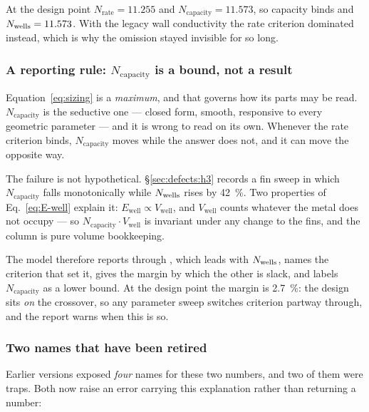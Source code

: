 At the design point $N_{\mathrm{rate}}=11.255$ and
$N_{\mathrm{capacity}}=11.573$, so capacity binds and $N_{\mathrm{wells}}=11.573$. With
the legacy wall conductivity the rate criterion dominated instead, which is why
the omission stayed invisible for so long.

\subsubsection*{A reporting rule: $N_{\mathrm{capacity}}$ is a bound, not a result}
\label{sec:hydraulics:capacity}

Equation~\eqref{eq:sizing} is a \emph{maximum}, and that governs how its parts
may be read. $N_{\mathrm{capacity}}$ is the seductive one --- closed form,
smooth, responsive to every geometric parameter --- and it is wrong to read on
its own. Whenever the rate criterion binds, $N_{\mathrm{capacity}}$ moves while
the answer does not, and it can move the opposite way.

The failure is not hypothetical. \S\ref{sec:defects:h3} records a fin sweep in
which $N_{\mathrm{capacity}}$ falls monotonically while $N_{\mathrm{wells}}$ rises by
\SI{42}{\percent}. Two properties of Eq.~\eqref{eq:E-well} explain it:
$E_{\mathrm{well}} \propto V_{\mathrm{well}}$, and $V_{\mathrm{well}}$ counts
whatever the metal does not occupy --- so $N_{\mathrm{capacity}}\cdot
V_{\mathrm{well}}$ is invariant under any change to the fins, and the column is
pure volume bookkeeping.

The model therefore reports through , which leads with
$N_{\mathrm{wells}}$, names the criterion that set it, gives the margin by which the other
is slack, and labels $N_{\mathrm{capacity}}$ as a lower bound. At the design
point the margin is \SI{2.7}{\percent}: the design sits \emph{on} the crossover,
so any parameter sweep switches criterion partway through, and the report warns
when this is so.

\subsubsection*{Two names that have been retired}

Earlier versions exposed \emph{four} names for these two numbers, and two of
them were traps. Both now raise an error carrying this explanation rather than
returning a number:

